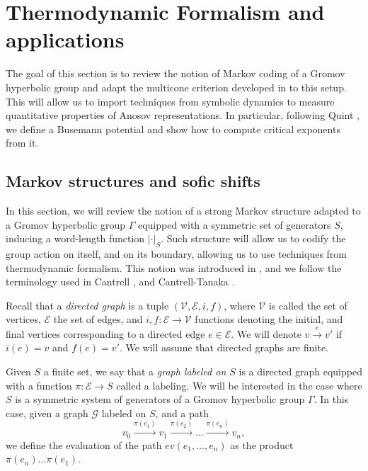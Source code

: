 \documentclass{amsart}
\theoremstyle{remark}
\theoremstyle{definition}
\begin{document}
\section{Thermodynamic Formalism and applications}
\label{sec:thermodynamic}

The goal of this section is to review the notion of Markov coding of a Gromov hyperbolic group and adapt the multicone criterion developed in \cite{bochi2019anosov} to this setup.
This will allow us to import techniques from symbolic dynamics to measure quantitative properties of Anosov representations.
In particular, following Quint \cite{quint2005schottky}, we define a Busemann potential and show how to compute critical exponents from it.


\subsection{Markov structures and sofic shifts}
\label{sec:markov}

In this section, we will review the notion of a strong Markov structure adapted to a Gromov hyperbolic group $\Gamma$ equipped with a symmetric set of generators $S$, inducing a word-length function $|\cdot|_S$.
Such structure will allow us to codify the group action on itself, and on its boundary, allowing us to use techniques from thermodynamic formalism. This notion was introduced in \cite{ghys1990sur}, and we follow the terminology used in Cantrell \cite{cantrell2025mixing}, and Cantrell-Tanaka \cite{cantrell2025manhattan}.

Recall that a \emph{directed graph} is a tuple $(\mathcal{V},\mathcal{E}, i,f)$, where $\mathcal{V}$ is called the set of vertices, $\mathcal{E}$ the set of edges, and $i,f: \mathcal{E} \rightarrow \mathcal{V}$ functions denoting the initial, and final vertices corresponding to a directed edge $e \in \mathcal{E}$.
We will denote $v \xrightarrow{e} v'$ if $i(e) =v$ and $f(e) = v'$.
We will assume that directed graphs are finite.

Given $S$ a finite set, we say that a \emph{graph labeled on $S$} is a directed graph equipped with a function $\pi: \mathcal{E} \rightarrow S$ called a labeling.
We will be interested in the case where $S$ is a symmetric system of generators of a Gromov hyperbolic group $\Gamma$.
In this case, given a graph $\mathcal{G}$ labeled on $S$, and a path
$$v_0 \xrightarrow{\pi(e_1)} v_1 \xrightarrow{\pi(e_2)} \ldots \xrightarrow{\pi(e_{n})} v_n,$$ 
we define the evaluation of the path $ev (e_1,\ldots,e_n)$ as the product $\pi (e_n) \ldots \pi (e_1)$.
\end{document}
